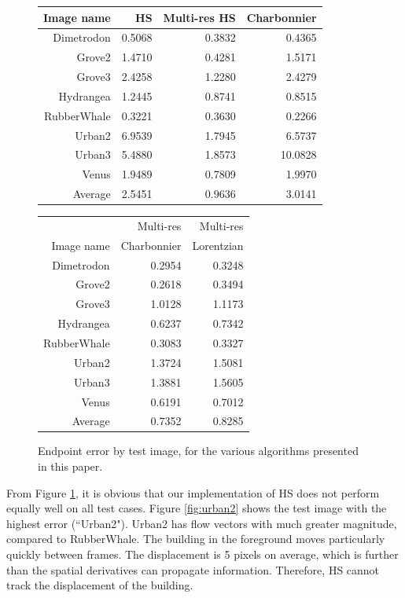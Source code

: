 \documentclass[10pt,twocolumn,letterpaper]{article}
\begin{document}
\begin{figure}
\begin{tabular} {|r | r | r| r |}
\hline
Image name & HS & Multi-res HS & Charbonnier \\
\hline 
Dimetrodon & 0.5068 &  0.3832 & 0.4365 \\
Grove2 & 1.4710 & 0.4281 & 1.5171\\
Grove3 &  2.4258 & 1.2280 & 2.4279\\
Hydrangea & 1.2445 & 0.8741 & 0.8515\\
RubberWhale & 0.3221 & 0.3630 & 0.2266\\
Urban2 & 6.9539 & 1.7945 & 6.5737\\
Urban3 & 5.4880 & 1.8573 & 10.0828\\
Venus & 1.9489 & 0.7809 & 1.9970\\
\hline
Average & 2.5451 & 0.9636 & 3.0141 \\
\hline

\end{tabular}
\begin{tabular} {|r | r | r|}
\hline
& Multi-res & Multi-res \\
Image name &  Charbonnier & Lorentzian \\
\hline 
Dimetrodon & 0.2954 & 0.3248 \\
Grove2 & 0.2618 & 0.3494 \\
Grove3 & 1.0128 & 1.1173\\
Hydrangea & 0.6237 & 0.7342  \\
RubberWhale & 0.3083 & 0.3327 \\
Urban2 & 1.3724 & 1.5081 \\
Urban3 & 1.3881 & 1.5605\\
Venus & 0.6191 & 0.7012\\
\hline
Average & 0.7352 & 0.8285 \\
\hline


\end{tabular}

\caption{Endpoint error by test image, for the various algorithms presented in this paper.}
\label{fig:table}
\end{figure}

From Figure \ref{fig:table}, it is obvious that our implementation of HS does not perform equally well on all test cases.  Figure \ref{fig:urban2} shows the test image with the highest error (``Urban2").  Urban2 has flow vectors with much greater magnitude, compared to RubberWhale.  The building in the foreground moves particularly quickly between frames.  The displacement is 5 pixels on average, which is further than the spatial derivatives can propagate information.  Therefore, HS cannot track the displacement of the building.  
\end{document}
